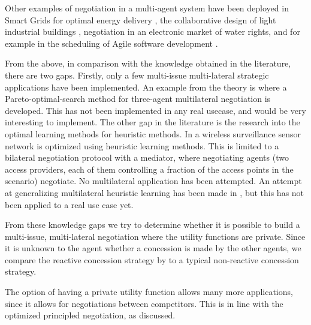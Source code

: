 Other examples of negotiation in a multi-agent system have been deployed in Smart Grids for optimal energy delivery \citep{pipattanasomporn2009multi}, the collaborative design of light industrial buildings \citep{anumba2003negotiation}, negotiation in an electronic market of water rights, and for example in the scheduling of Agile software development \citep{rabelo1999multi}.

From the above, in comparison with the knowledge obtained in the literature, there are two gaps. Firstly, only a few multi-issue multi-lateral strategic applications have been implemented. An example from the theory is \citet{wu2009efficient} where a Pareto-optimal-search method for three-agent multilateral negotiation is developed. This has not been implemented in any real usecase, and would be very interesting to implement. The other gap in the literature is the research into the optimal learning methods for heuristic methods. In \citep{de2015automated} a wireless surveillance sensor network is optimized using heuristic learning methods. This is limited to a bilateral negotiation protocol with a mediator, where negotiating agents (two access providers, each of them controlling a fraction of the access points in the scenario) negotiate. No multilateral application has been attempted. An attempt at generalizing multilateral heuristic learning has been made in \citet{beheshti2014homan}, but this has not been applied to a real use case yet. 

From these knowledge gaps we try to determine whether it is possible to build a multi-issue, multi-lateral negotiation where the utility functions are private. Since it is unknown to the agent whether a concession is made by the other agents, we compare the reactive concession strategy by \citet{zheng2015automated} to a typical non-reactive concession strategy.

The option of having a private utility function allows many more applications, since it allows for negotiations between competitors. This is in line with the optimized principled negotiation, as discussed.